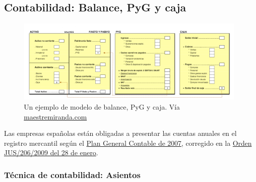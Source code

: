 \documentclass[nochap,palatino,shortheader]{apuntes}
\begin{document}
\subsection{Contabilidad: Balance, PyG y caja}
\label{sec:Contabilidad}

\begin{figure}[hbtp]
\centering
\includegraphics[width=\textwidth]{img/Balance_PyG_Caja.png}
\caption{Un ejemplo de modelo de balance, PyG y caja. Vía \href{http://maestremiranda.com/techdir/wp-content/uploads/2015/10/EF0.-Bal_PYG_Caja.pdf}{maestremiranda.com}}
\label{fig:BalancePyGCaja}
\end{figure}

Las empresas españolas están obligadas a presentar las cuentas anuales en el registro mercantil según el \href{https://www.boe.es/buscar/doc.php?id=BOE-A-2007-13023}{Plan General Contable de 2007}, corregido en la \href{https://www.boe.es/boe/dias/2009/02/10/pdfs/BOE-A-2009-2276.pdf}{Orden JUS/206/2009 del 28 de enero}.

\subsubsection{Técnica de contabilidad: Asientos}
\end{document}

